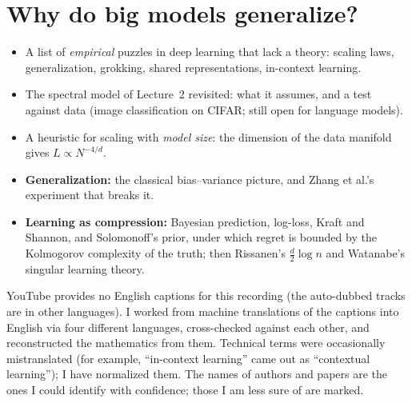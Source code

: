 \chapter{Why do big models generalize?}\label{ch:L3}

\begin{glance}
\begin{itemize}
  \item A list of \emph{empirical} puzzles in deep learning that lack a theory: scaling laws, generalization, grokking, shared representations, in-context learning.
  \item The spectral model of Lecture~2 revisited: what it assumes, and a test against data (image classification on CIFAR; still open for language models).
  \item A heuristic for scaling with \emph{model size}: the dimension of the data manifold gives $L\propto N^{-4/d}$.
  \item \textbf{Generalization:} the classical bias--variance picture, and Zhang et al.'s experiment that breaks it.
  \item \textbf{Learning as compression:} Bayesian prediction, log-loss, Kraft and Shannon, and Solomonoff's prior, under which regret is bounded by the Kolmogorov complexity of the truth; then Rissanen's $\tfrac d2\log n$ and Watanabe's singular learning theory.
\end{itemize}
\end{glance}

\begin{caution}
YouTube provides no English captions for this recording (the auto-dubbed tracks are in other languages). I worked from machine translations of the captions into English via four different languages, cross-checked against each other, and reconstructed the mathematics from them. Technical terms were occasionally mistranslated (for example, ``in-context learning'' came out as ``contextual learning''); I have normalized them. The names of authors and papers are the ones I could identify with confidence; those I am less sure of are marked\flag.
\end{caution}

